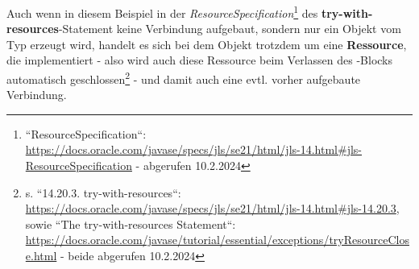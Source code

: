 \noindent
Auch wenn in diesem Beispiel in der \textit{ResourceSpecification}\footnote{
``ResourceSpecification``: \url{https://docs.oracle.com/javase/specs/jls/se21/html/jls-14.html#jls-ResourceSpecification} - abgerufen 10.2.2024
} des \textbf{try-with-resources}-Statement keine Verbindung aufgebaut, sondern nur ein Objekt vom Typ  erzeugt wird, handelt es sich bei dem Objekt trotzdem um eine \textbf{Ressource}, die  implementiert - also wird auch diese Ressource beim Verlassen des -Blocks automatisch geschlossen\footnote{
s. ``14.20.3. try-with-resources``: \url{https://docs.oracle.com/javase/specs/jls/se21/html/jls-14.html#jls-14.20.3}, sowie ``The try-with-resources Statement``: \url{https://docs.oracle.com/javase/tutorial/essential/exceptions/tryResourceClose.html} - beide abgerufen 10.2.2024
} - und damit auch eine {evtl.} vorher aufgebaute Verbindung.